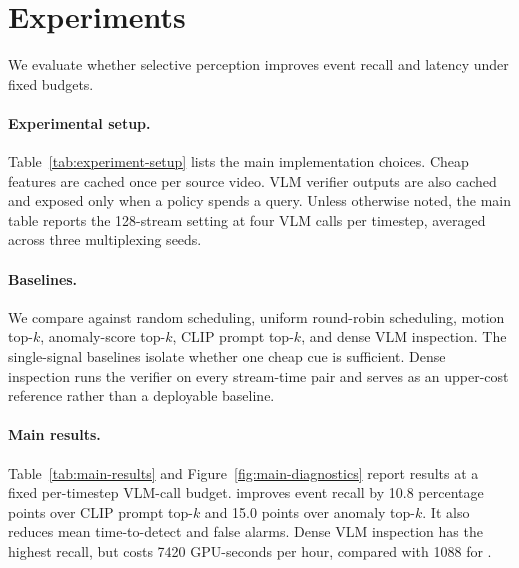 \section{Experiments}

We evaluate whether selective perception improves event recall and latency under fixed budgets.

\paragraph{Experimental setup.}
Table~\ref{tab:experiment-setup} lists the main implementation choices. Cheap features are cached once per source video. VLM verifier outputs are also cached and exposed only when a policy spends a query. Unless otherwise noted, the main table reports the 128-stream setting at four VLM calls per timestep, averaged across three multiplexing seeds.

\begin{table}[t]
\centering
\small
\caption{Core experimental setup. The exact VLM cache can be regenerated from the released query-pool schema.}
\label{tab:experiment-setup}

\end{table}

\paragraph{Baselines.}
We compare against random scheduling, uniform round-robin scheduling, motion top-$k$, anomaly-score top-$k$, CLIP prompt top-$k$, and dense VLM inspection. The single-signal baselines isolate whether one cheap cue is sufficient. Dense inspection runs the verifier on every stream-time pair and serves as an upper-cost reference rather than a deployable baseline.

\paragraph{Main results.}
Table~\ref{tab:main-results} and Figure~\ref{fig:main-diagnostics} report results at a fixed per-timestep VLM-call budget. \method{} improves event recall by 10.8 percentage points over CLIP prompt top-$k$ and 15.0 points over anomaly top-$k$. It also reduces mean time-to-detect and false alarms. Dense VLM inspection has the highest recall, but costs 7420 GPU-seconds per hour, compared with 1088 for \method.

\begin{table}[t]
\centering
\caption{Main results under a fixed VLM-call budget. Numbers are reported at the episode level and aggregated over benchmark tracks.}
\label{tab:main-results}

\end{table}

